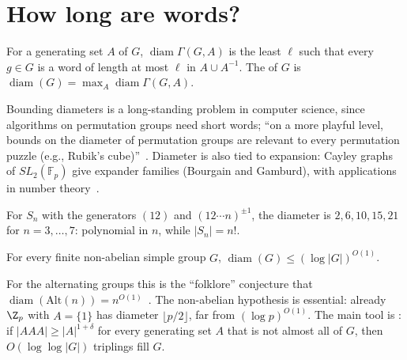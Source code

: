 \section{How long are words?}\label{sec:diameter}

\begin{definition}\label{def:diameter}
For a generating set $A$ of $G$, $\operatorname{diam}\Gamma(G,A)$ is the least $\ell$ such that every $g\in G$ is a word of length at most $\ell$ in $A\cup A^{-1}$. The  of $G$ is $\operatorname{diam}(G)=\max_A\operatorname{diam}\Gamma(G,A)$.
\end{definition}

Bounding diameters is a long-standing problem in computer science, since algorithms on permutation groups need short words; ``on a more playful level, bounds on the diameter of permutation groups are relevant to every permutation puzzle (e.g., Rubik's cube)''~\cite[\S1]{hs14}. Diameter is also tied to expansion: Cayley graphs of $SL_2(\mathbb F_p)$ give expander families (Bourgain and Gamburd), with applications in number theory~\cite{gre09}.

\begin{example}\label{ex:sn-diameter}
For $S_n$ with the generators $(12)$ and $(12\cdots n)^{\pm1}$, the diameter is $2,6,10,15,21$ for $n=3,\dots,7$: polynomial in $n$, while $|S_n|=n!$.
\end{example}

\begin{conjecture}\label{conj:babai}
For every finite non-abelian simple group $G$, $\operatorname{diam}(G)\leq(\log|G|)^{O(1)}$.
\end{conjecture}

For the alternating groups this is the ``folklore'' conjecture that $\operatorname{diam}(\mathrm{Alt}(n))=n^{O(1)}$~\cite[\S1]{hs14}. The non-abelian hypothesis is essential: already $\Z_p$ with $A=\{1\}$ has diameter $\lfloor p/2\rfloor$, far from $(\log p)^{O(1)}$. The main tool is : if $|AAA|\geq|A|^{1+\delta}$ for every generating set $A$ that is not almost all of $G$, then $O(\log\log|G|)$ triplings fill $G$.
